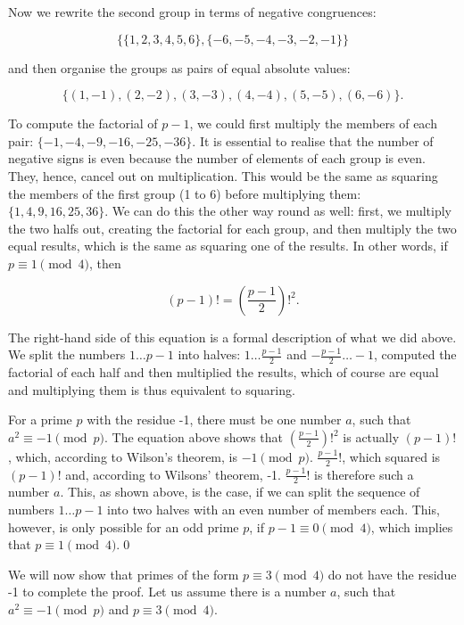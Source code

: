 \documentclass{scrreprt}
\begin{document}
Now we rewrite the second group in terms of negative congruences:

\[
\lbrace\lbrace 1,2,3,4,5,6\rbrace, 
       \lbrace -6,-5,-4,-3,-2,-1\rbrace\rbrace
\]

and then organise the groups as pairs of equal 
absolute values:

\[
\lbrace (1,-1), (2,-2), (3,-3), (4,-4), (5,-5), (6,-6)\rbrace.
\]

To compute the factorial of $p-1$,
we could first multiply the members of each pair:
$\lbrace -1, -4, -9, -16, -25, -36\rbrace$.
It is essential to realise 
that the number of negative signs is even because
the number of elements of each group is even.
They, hence, cancel out on multiplication.
This would be the same as squaring 
the members of the first group (1 to 6)
before multiplying them:
$\lbrace 1, 4, 9, 16, 25, 36\rbrace$.
We can do this the other way round as well:
first, we multiply the two halfs out,
creating the factorial for each group,
and then multiply the two equal results, 
which is the same as squaring one of the results. 
In other words,
if $p \equiv 1 \pmod{4}$, then 

\begin{equation}
(p-1)! = \left(\frac{p-1}{2}\right)!^2.
\end{equation}

The right-hand side of this equation
is a formal description of what we did above.
We split the numbers $1\dots p-1$ into halves:
$1\dots \frac{p-1}{2}$ and $-\frac{p-1}{2} \dots -1$,
computed the factorial of each half and then
multiplied the results, which of course are equal
and multiplying them is thus equivalent to squaring.

For a prime $p$ with the residue -1, there must be one number
$a$, such that
$a^2 \equiv -1 \pmod{p}$.
The equation above shows that 
$(\frac{p-1}{2})!^2$ is actually $(p-1)!$,
which, according to Wilson's theorem, is $-1 \pmod{p}$.
$\frac{p-1}{2}!$, which squared
is $(p-1)!$ and, according to Wilsons' theorem, -1.
$\frac{p-1}{2}!$ is therefore such a number $a$. 
This, as shown above, is the case,
if we can split the sequence of numbers $1\dots p-1$
into two halves with an even number of members each.
This, however, is only possible for an odd prime $p$,
if $p-1 \equiv 0 \pmod{4}$,
which implies that $p \equiv 1 \pmod{4}$.\qed

We will now show that primes of the form
$p \equiv 3 \pmod{4}$ do not have the residue -1
to complete the proof.
Let us assume there is a number $a$,
such that $a^2 \equiv -1 \pmod{p}$ and 
$p \equiv 3 \pmod{4}$.
\end{document}
